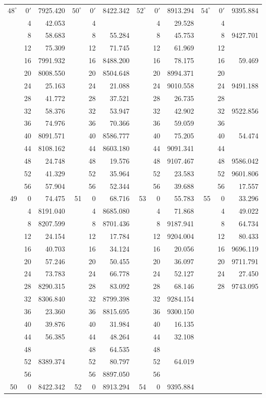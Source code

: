 \noindent\hfill
{\small\setlength{\tabcolsep}{4.5pt}\renewcommand{\arraystretch}{1.12}%
\begin{tabular}{@{}rr|r||rr|r||rr|r||rr|r@{}}
\hline
\(48^\circ\)&\(0'\)&7925.420&\(50^\circ\)&\(0'\)&8422.342&\(52^\circ\)&\(0'\)&8913.294&\(54^\circ\)&\(0'\)&9395.884\\
&4&42.053&&4&&&4&29.528&&4&\\
&8&58.683&&8&55.284&&8&45.753&&8&9427.701\\
&12&75.309&&12&71.745&&12&61.969&&12&\\
&16&7991.932&&16&8488.200&&16&78.175&&16&59.469\\
\hline
&20&8008.550&&20&8504.648&&20&8994.371&&20&\\
&24&25.163&&24&21.088&&24&9010.558&&24&9491.188\\
&28&41.772&&28&37.521&&28&26.735&&28&\\
&32&58.376&&32&53.947&&32&42.902&&32&9522.856\\
&36&74.976&&36&70.366&&36&59.059&&36&\\
\hline
&40&8091.571&&40&8586.777&&40&75.205&&40&54.474\\
&44&8108.162&&44&8603.180&&44&9091.341&&44&\\
&48&24.748&&48&19.576&&48&9107.467&&48&9586.042\\
&52&41.329&&52&35.964&&52&23.583&&52&9601.806\\
&56&57.904&&56&52.344&&56&39.688&&56&17.557\\
\hline
49&0&74.475&51&0&68.716&53&0&55.783&55&0&33.296\\
&4&8191.040&&4&8685.080&&4&71.868&&4&49.022\\
&8&8207.599&&8&8701.436&&8&9187.941&&8&64.734\\
&12&24.154&&12&17.784&&12&9204.004&&12&80.433\\
&16&40.703&&16&34.124&&16&20.056&&16&9696.119\\
\hline
&20&57.246&&20&50.455&&20&36.097&&20&9711.791\\
&24&73.783&&24&66.778&&24&52.127&&24&27.450\\
&28&8290.315&&28&83.092&&28&68.146&&28&9743.095\\
&32&8306.840&&32&8799.398&&32&9284.154&&&\\
&36&23.360&&36&8815.695&&36&9300.150&&&\\
\hline
&40&39.876&&40&31.984&&40&16.135&&&\\
&44&56.385&&44&48.264&&44&32.108&&&\\
&48&&&48&64.535&&48&&&&\\
&52&8389.374&&52&80.797&&52&64.019&&&\\
&56&&&56&8897.050&&56&&&&\\
\hline
50&0&8422.342&52&0&8913.294&54&0&9395.884&&&
\end{tabular}}\hfill\null\par

